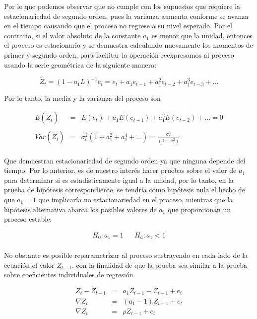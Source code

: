 Por lo que podemos observar que no cumple con los supuestos que requiere la estacionariedad de segundo orden, pues la varianza aumenta conforme se avanza en el tiempo causando que el proceso no regrese a su nivel esperado. Por el contrario, si el valor absoluto de la constante $a_1$ es menor que la unidad, entonces el proceso es estacionario y se demuestra calculando nuevamente los momentos de primer y segundo orden, para facilitar la operación reexpresamos al proceso usando la serie geométrica de la siguiente manera:

\begin{equation}\label{eq:AR_MA}
\tilde{Z}_t=(1-a_1L)^{-1}e_t=e_t+a_1e_{t-1}+a_1^2e_{t-2}+ a_1^3e_{t-3}+...
\end{equation} 

Por lo tanto, la media y la varianza del proceso son

 \begin{eqnarray}
 E(\tilde{Z}_t) &  =&  E(e_t) + a_1E(e_{t-1})+ a_1^2E(e_{t-2})+...= 0 \nonumber  \\ 
         &  &    \\
         Var(\tilde{Z}_t) & =& \sigma^2_e (1+a_1^2+ a_1^4+ ...)= \frac{\sigma_e^2}{(1-a_1^2)}  \nonumber \\
 & &  \nonumber 
\end{eqnarray}

Que demuestran estacionariedad de segundo orden ya que ninguna depende del tiempo. Por lo anterior, es de nuestro interés hacer pruebas sobre el valor de $a_1$ para determinar si es estadísticamente igual a la unidad, por lo tanto, en la prueba de hipótesis correspondiente, se tendría como hipótesis nula el hecho de que $a_1=1$ que implicaría no estacionariedad en el proceso, mientras que la hipótesis alternativa abarca los posibles valores de $a_1$ que proporcionan un proceso estable:

   \begin{eqnarray}
    H_0: a_1=1 &  &  H_a: a_1 <1   \\ 
    \nonumber 
   \end{eqnarray} 

No obstante es posible reparametrizar al proceso sustrayendo en cada lado de la ecuación el valor $Z_{t-1}$, con la finalidad de que la prueba sea similar a la prueba sobre coeficientes individuales de regresión


 \begin{eqnarray}\label{eq:proceso1}
 Z_t-Z_{t-1} &  =& a_1Z_{t-1}-Z_{t-1}+e_t\nonumber  \\ 
       \nabla Z_t &= & (a_1-1)Z_{t-1}+e_t   \\
         \nabla Z_t & =& \rho Z_{t-1}+e_t  \nonumber \\
 & &  \nonumber 
\end{eqnarray}

